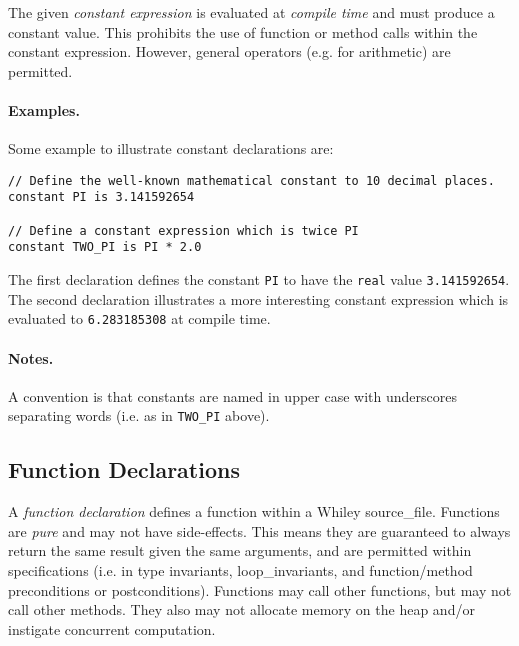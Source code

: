The given {\em constant expression} is evaluated at {\em compile time}
and must produce a constant value.  This prohibits the use of function
or method calls within the constant expression.  However, general
operators (e.g. for arithmetic) are permitted.

\paragraph{Examples.}  Some example to illustrate constant
declarations are:

\begin{lstlisting}
// Define the well-known mathematical constant to 10 decimal places.
constant PI is 3.141592654

// Define a constant expression which is twice PI
constant TWO_PI is PI * 2.0
\end{lstlisting}

The first declaration defines the constant \lstinline{PI} to have the
\lstinline{real} value \lstinline{3.141592654}.  The second
declaration illustrates a more interesting constant expression which
is evaluated to \lstinline{6.283185308} at compile time.

\paragraph{Notes.}  A convention is that constants are named in upper
case with underscores separating words (i.e. as in \lstinline{TWO_PI}
above).


\subsection{Function Declarations}

A {\em function declaration} defines a function within a Whiley
\gls{source_file}.  Functions are {\em pure} and may not have
side-effects.  This means they are guaranteed to always return the
same result given the same arguments, and are permitted within
specifications (i.e. in type invariants, \gls{loop_invariant}s, and
function/method \gls{precondition}s or \gls{postcondition}s).
Functions may call other functions, but may not call other methods.
They also may not allocate memory on the heap and/or instigate
concurrent computation.

